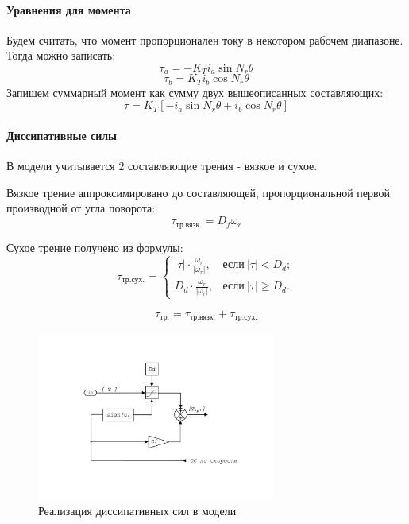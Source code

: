 \paragraph{ Уравнения для момента }
Будем считать, что момент пропорционален току в некотором рабочем диапазоне. Тогда можно записать:
$$
    \tau_{a} = - K_{T} i_{a} \sin{N_{r} \theta}
$$
$$
    \tau_{b} = K_{T} i_{b} \cos{N_{r} \theta}
$$
Запишем суммарный момент как сумму двух вышеописанных составляющих:
\begin{equation}
    \tau = K_{T} [-i_{a} \sin{N_{r}\theta} + i_{b} \cos{N_{r}\theta}]
\end{equation}


\paragraph{ Диссипативные силы }
В модели учитывается 2 составляющие трения - вязкое и сухое.

Вязкое трение аппроксимировано до составляющей, пропорциональной первой производной от угла поворота:
\begin{equation}
    \tau_{\text{тр.вязк.}} = D_{f} \omega_{r}
\end{equation}

Сухое трение получено из формулы:
\begin{equation}
    \tau_{\text{тр.сух.}} = \begin{cases}
         |\tau| \cdot \frac{\omega_{r}}{|\omega_{r}|}, & \text{если} ~|\tau|  <  D_{d}; \\[2mm]
         D_{d}  \cdot \frac{\omega_{r}}{|\omega_{r}|}, & \text{если} ~|\tau| \ge D_{d}.
    \end{cases}
\end{equation}

\begin{equation}
    \tau_{\text{тр.}} = \tau_{\text{тр.вязк.}} + \tau_{\text{тр.сух.}}
\end{equation}

\begin{figure}[ht!]
    \centering
    \includegraphics[width=0.7\textwidth, keepaspectratio, clip=true, trim=25mm 35mm 25mm 35mm]
                    {./src/pictures/drive_model/drive_model_friction}
    \caption{Реализация диссипативных сил в модели}
    \label{pic_drive_model_friction}
\end{figure}


